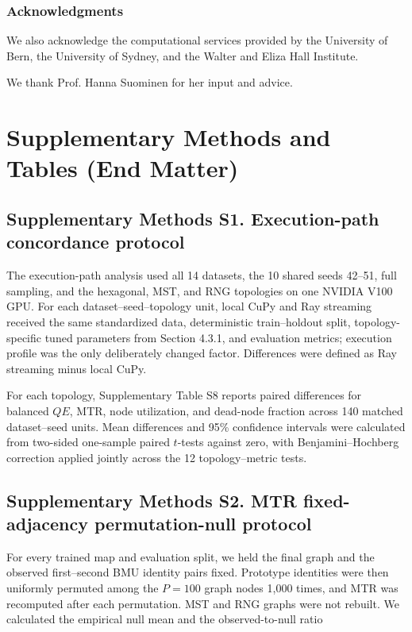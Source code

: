 \documentclass[10pt]{article} %
\begin{document}
\subsubsection*{Acknowledgments}

We also acknowledge the computational services provided by the University of Bern, the University of Sydney, and the Walter and Eliza Hall Institute.

We thank Prof. Hanna Suominen for her input and advice.



\clearpage

\appendix
\section{Supplementary Methods and Tables (End Matter)}

\subsection{Supplementary Methods S1. Execution-path concordance protocol}

The execution-path analysis used all 14 datasets, the 10 shared seeds 42--51, full sampling, and the hexagonal, MST, and RNG topologies on one NVIDIA V100 GPU. For each dataset--seed--topology unit, local CuPy and Ray streaming received the same standardized data, deterministic train--holdout split, topology-specific tuned parameters from Section 4.3.1, and evaluation metrics; execution profile was the only deliberately changed factor. Differences were defined as Ray streaming minus local CuPy.

For each topology, Supplementary Table S8 reports paired differences for balanced $QE$, MTR, node utilization, and dead-node fraction across 140 matched dataset--seed units. Mean differences and 95\% confidence intervals were calculated from two-sided one-sample paired $t$-tests against zero, with Benjamini--Hochberg correction applied jointly across the 12 topology--metric tests.

\subsection{Supplementary Methods S2. MTR fixed-adjacency permutation-null protocol}

For every trained map and evaluation split, we held the final graph and the observed first--second BMU identity pairs fixed. Prototype identities were then uniformly permuted among the $P=100$ graph nodes 1,000 times, and MTR was recomputed after each permutation. MST and RNG graphs were not rebuilt. We calculated the empirical null mean and the observed-to-null ratio
\end{document}
